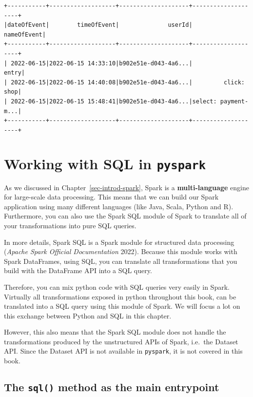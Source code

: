 \documentclass[
  11pt,
  letterpaper,
  DIV=11,
  numbers=noendperiod]{scrreprt}
\begin{document}
\begin{verbatim}
+-----------+-------------------+--------------------+--------------------+
|dateOfEvent|        timeOfEvent|              userId|         nameOfEvent|
+-----------+-------------------+--------------------+--------------------+
| 2022-06-15|2022-06-15 14:33:10|b902e51e-d043-4a6...|               entry|
| 2022-06-15|2022-06-15 14:40:08|b902e51e-d043-4a6...|         click: shop|
| 2022-06-15|2022-06-15 15:48:41|b902e51e-d043-4a6...|select: payment-m...|
+-----------+-------------------+--------------------+--------------------+
\end{verbatim}


\hypertarget{sec-dataframe-sql-chapter}{%
\chapter{\texorpdfstring{Working with SQL in
\texttt{pyspark}}{Working with SQL in pyspark}}\label{sec-dataframe-sql-chapter}}

As we discussed in Chapter~\ref{sec-introd-spark}, Spark is a
\textbf{multi-language} engine for large-scale data processing. This
means that we can build our Spark application using many different
languages (like Java, Scala, Python and R). Furthermore, you can also
use the Spark SQL module of Spark to translate all of your
transformations into pure SQL queries.

In more details, Spark SQL is a Spark module for structured data
processing (\emph{Apache Spark Official Documentation} 2022). Because
this module works with Spark DataFrames, using SQL, you can translate
all transformations that you build with the DataFrame API into a SQL
query.

Therefore, you can mix python code with SQL queries very easily in
Spark. Virtually all transformations exposed in python throughout this
book, can be translated into a SQL query using this module of Spark. We
will focus a lot on this exchange between Python and SQL in this
chapter.

However, this also means that the Spark SQL module does not handle the
transformations produced by the unstructured APIs of Spark, i.e.~the
Dataset API. Since the Dataset API is not available in \texttt{pyspark},
it is not covered in this book.

\hypertarget{the-sql-method-as-the-main-entrypoint}{%
\section{\texorpdfstring{The \texttt{sql()} method as the main
entrypoint}{The sql() method as the main entrypoint}}\label{the-sql-method-as-the-main-entrypoint}}
\end{document}
